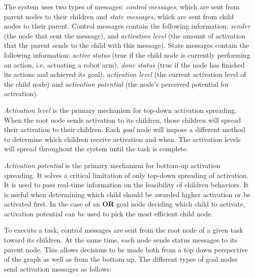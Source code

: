 \documentclass[conference]{article}
\begin{document}
The system uses two types of messages: \emph{control messages}, which are sent from parent nodes to their children and \emph{state messages}, which are sent from child nodes to their parent. Control messages contain the following information: \emph{sender} (the node that sent the message), and \emph{activation level} (the amount of activation that the parent sends to the child with this message). State messages contain the following information: \emph{active status} (true if the child node is currently performing an action, i.e, actuating a robot arm), \emph{done status} (true if the node has finished its actions and achieved its goal), \emph{activation level} (the current activation level of the child node) and \emph{activation potential} (the node's perceived potential for activation).

\emph{Activation level} is the primary mechanism for top-down activation spreading. When the root node sends activation to its children, those children will spread their activation to their children. Each \emph{goal} node will impose a different method to determine which children receive activation and when. The activation levels will spread throughout the system until the task is complete.

\emph{Activation potential} is the primary mechanism for bottom-up activation spreading. It solves a critical limitation of only top-down spreading of activation. It is used to pass real-time information on the feasibility of children behaviors. It is useful when determining which child should be awarded higher activation or be activated first. In the case of an {\bf OR} goal node deciding which child to activate, activation potential can be used to pick the most efficient child node.

To execute a task, control messages are sent from the root node of a given task toward its children. At the same time, each node sends status messages to its parent node. This allows decisions to be made both from a top down perspective of the graph as well as from the bottom up. The different types of goal nodes send activation messages as follows:
\end{document}
